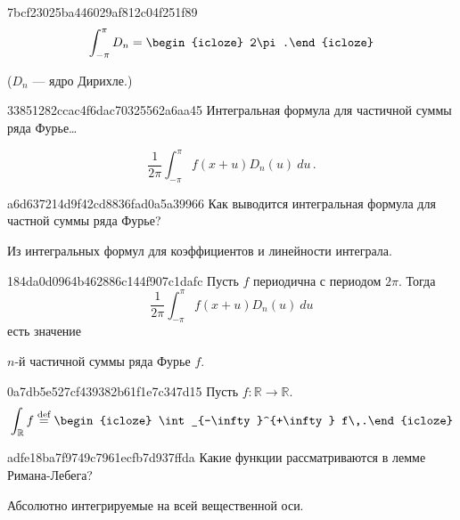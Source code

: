 \begin{note}{7bcf23025ba446029af812c04f251f89}
    \[
        \int_{-\pi}^{\pi} D_n = \begin{icloze}{1}2\pi.\end{icloze}
    \]

    \begin{center}
        \tiny
        (\({ D_n }\) --- ядро Дирихле.)
    \end{center}
\end{note}

\begin{note}{33851282ccac4f6dac70325562a6aa45}
    Интегральная формула для частичной суммы ряда Фурье\ldots

    \begin{cloze}{1}
        \[
            \frac{1}{2\pi} \int_{-\pi}^{\pi} f(x+u) D_{n}(u)\: du\,.
        \]
    \end{cloze}
\end{note}

\begin{note}{a6d637214d9f42cd8836fad0a5a39966}
    Как выводится интегральная формула для частной суммы ряда Фурье?

    \begin{cloze}{1}
        Из интегральных формул для коэффициентов и линейности интеграла.
    \end{cloze}
\end{note}

\begin{note}{184da0d0964b462886c144f907c1dafc}
    Пусть \({ f }\) периодична с периодом \({ 2\pi }\).
    Тогда
    \[
        \frac{1}{2\pi} \int_{-\pi}^{\pi} f(x + u) D_n(u)\: du
    \]
    есть значение \begin{icloze}{1}\({ n }\)-й частичной суммы ряда Фурье \({ f }\).\end{icloze}
\end{note}

\begin{note}{0a7db5e527cf439382b61f1e7c347d15}
    Пусть \({ f : \mathbb R \to \mathbb R }\).
    \[
        \int_{\mathbb R} f \overset{\text{def}}= \begin{icloze}{1}\int_{-\infty}^{+\infty} f\,.\end{icloze}
    \]
\end{note}

\begin{note}{adfe18ba7f9749c7961ecfb7d937ffda}
    Какие функции рассматриваются в лемме Римана-Лебега?

    \begin{cloze}{1}
        Абсолютно интегрируемые на всей вещественной оси.
    \end{cloze}
\end{note}

